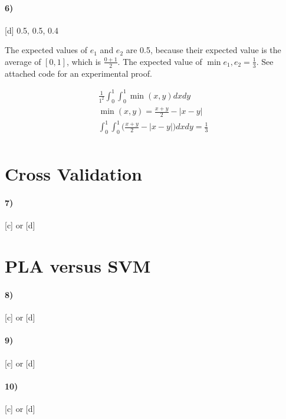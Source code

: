 \documentclass[10pt,letter]{article}
\begin{document}
\paragraph{6)} [d] 0.5, 0.5, 0.4

	The expected values of $e_1$ and $e_2$ are 0.5, because their expected value is the average of $[0,1]$, which is $\frac{0+1}{2}$. The expected value of $\min{e_1, e_2} = \frac{1}{3}$. See attached code for an experimental proof. 

	\begin{align*}
	\frac{1}{1^2} \int_0^1 \int_0^1 \min(x, y) dx dy \\
	\min(x, y) = \frac{x+y}{2} - |x - y| \\
	\int_0^1 \int_0^1 \big( \frac{x+y}{2} - |x - y| \big) dx dy  = \frac{1}{3}\\
	\end{align*}

\section*{Cross Validation}

\paragraph{7)} [c] or [d]

\section*{PLA versus SVM}

\paragraph{8)} [c] or [d]
\paragraph{9)} [c] or [d]
\paragraph{10)} [c] or [d]
\end{document}
